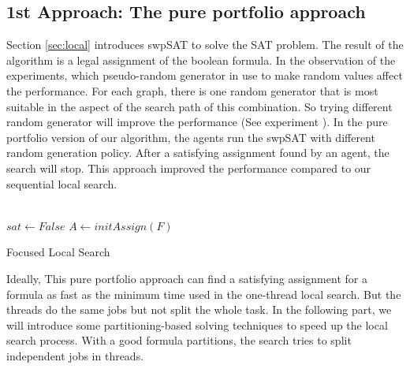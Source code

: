 \documentclass[12pt,a4paper,twoside]{scrartcl}
\numberwithin{equation}{section}
\begin{document}
\subsection{1st Approach: The pure portfolio approach}
Section \ref{sec:local} introduces swpSAT to solve the SAT problem.
The result of the algorithm is a legal assignment of
 the boolean formula. 
In the observation of the experiments, which pseudo-random generator in use to make random values affect the performance. For each graph, there is one
random generator that is most suitable in the aspect of the search path of this combination. So trying different random generator will improve the performance (See experiment ). In the pure portfolio version of our algorithm, the agents run the swpSAT with different random generation policy. After a satisfying assignment found by an agent, the search will stop. This approach improved the performance compared to our sequential local search.\\ 
\\
\begin{algorithm}[H]
  $sat \leftarrow False$\;
    $A \leftarrow initAssign(F)$
 \caption{Focused Local Search}
\end{algorithm}  
Ideally, This pure portfolio approach can find a satisfying assignment for a formula as fast as the minimum time used in the one-thread local search. But the threads do the same jobs but not split the whole task. 
In the following part, we will introduce some partitioning-based solving techniques to speed up the local search process. With a good formula partitions, the search tries to split independent jobs in threads. 
\end{document}
